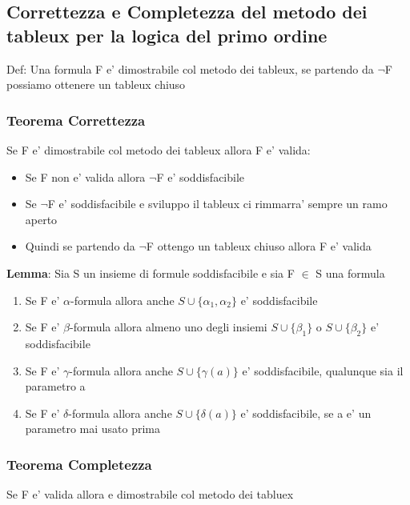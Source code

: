 \documentclass{article}
\begin{document}
         \subsection{Correttezza e Completezza del metodo dei tableux per la logica del primo ordine}
         \begin{flushleft}
           Def: Una formula F e' dimostrabile col metodo dei tableux, se partendo da $\neg$F possiamo ottenere un tableux chiuso
         \end{flushleft}
         \subsubsection{Teorema Correttezza}
         \begin{flushleft}
          Se F e' dimostrabile col metodo dei tableux allora F e' valida:
          \begin{itemize}
            \item Se F non e' valida allora $\neg$F e' soddisfacibile
            \item Se $\neg$F e' soddisfacibile e sviluppo il tableux ci rimmarra' sempre un ramo aperto
            \item Quindi se partendo da $\neg$F ottengo un tableux chiuso allora F e' valida
          \end{itemize}
         \end{flushleft}
         \begin{flushleft}
           \textbf{Lemma}: Sia S un insieme di formule soddisfacibile e sia F $\in$ S una formula
           \begin{enumerate}
             \item Se F e' $\alpha$-formula allora anche $S \cup \{ \alpha_1,\alpha_2\}$ e' soddisfacibile
             \item Se F e' $\beta$-formula allora almeno uno degli insiemi $S \cup \{ \beta_1\}$ o $S\cup \{\beta_2 \}$ e' soddisfacibile
             \item Se F e' $\gamma$-formula allora anche $S \cup \{ \gamma(a)\}$ e' soddisfacibile, qualunque sia il parametro a
             \item Se F e' $\delta$-formula allora anche $S \cup \{ \delta(a)\}$ e' soddisfacibile, se a e' un parametro mai usato prima
           \end{enumerate}
         \end{flushleft}
         \subsubsection{Teorema Completezza}
         \begin{flushleft}
          Se F e' valida allora e dimostrabile col metodo dei tabluex
         \end{flushleft}
\end{document}
